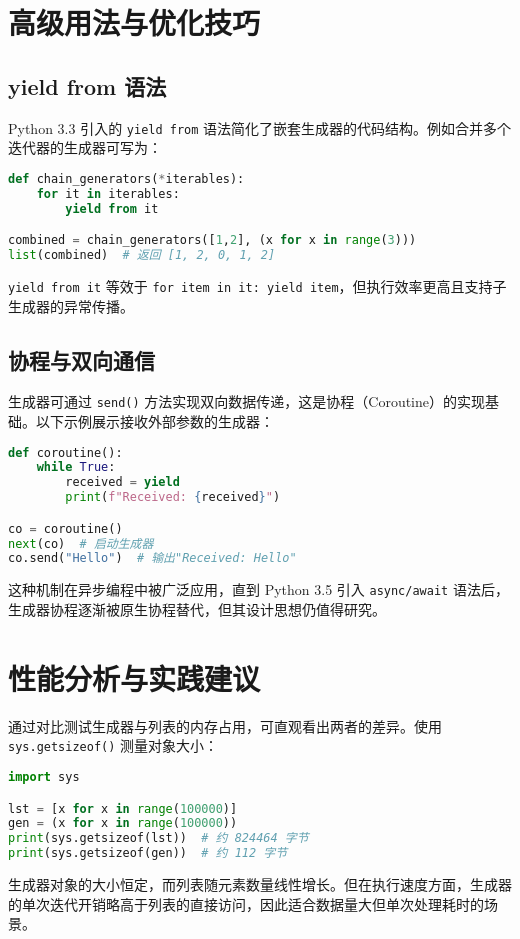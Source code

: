 \chapter{高级用法与优化技巧}
\section{yield from 语法}
Python 3.3 引入的 \verb!yield from! 语法简化了嵌套生成器的代码结构。例如合并多个迭代器的生成器可写为：\par
\begin{lstlisting}[language=python]
def chain_generators(*iterables):
    for it in iterables:
        yield from it

combined = chain_generators([1,2], (x for x in range(3)))
list(combined)  # 返回 [1, 2, 0, 1, 2]
\end{lstlisting}
\verb!yield from it! 等效于 \verb!for item in it: yield item!，但执行效率更高且支持子生成器的异常传播。\par
\section{协程与双向通信}
生成器可通过 \verb!send()! 方法实现双向数据传递，这是协程（Coroutine）的实现基础。以下示例展示接收外部参数的生成器：\par
\begin{lstlisting}[language=python]
def coroutine():
    while True:
        received = yield
        print(f"Received: {received}")

co = coroutine()
next(co)  # 启动生成器
co.send("Hello")  # 输出"Received: Hello"
\end{lstlisting}
这种机制在异步编程中被广泛应用，直到 Python 3.5 引入 \verb!async/await! 语法后，生成器协程逐渐被原生协程替代，但其设计思想仍值得研究。\par
\chapter{性能分析与实践建议}
通过对比测试生成器与列表的内存占用，可直观看出两者的差异。使用 \verb!sys.getsizeof()! 测量对象大小：\par
\begin{lstlisting}[language=python]
import sys

lst = [x for x in range(100000)]
gen = (x for x in range(100000))
print(sys.getsizeof(lst))  # 约 824464 字节
print(sys.getsizeof(gen))  # 约 112 字节
\end{lstlisting}
生成器对象的大小恒定，而列表随元素数量线性增长。但在执行速度方面，生成器的单次迭代开销略高于列表的直接访问，因此适合数据量大但单次处理耗时的场景。\par
